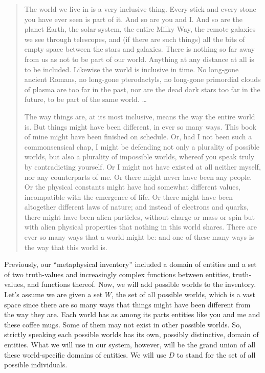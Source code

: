 \begin{quote}
  The world we live in is a very inclusive thing. Every stick and every stone
  you have ever seen is part of it. And so are you and I. And so are the planet
  Earth, the solar system, the entire Milky Way, the remote galaxies we see
  through telescopes, and (if there are such things) all the bits of empty space
  between the stars and galaxies. There is nothing so far away from us as not to
  be part of our world. Anything at any distance at all is to be included.
  Likewise the world is inclusive in time. No long-gone ancient Romans, no
  long-gone pterodactyls, no long-gone primordial clouds of plasma are too far
  in the past, nor are the dead dark stars too far in the future, to be part of
  the same world. \dots
	
  The way things are, at its most inclusive, means the way the entire world is.
  But things might have been different, in ever so many ways. This book of mine
  might have been finished on schedule. Or, had I not been such a commonsensical
  chap, I might be defending not only a plurality of possible worlds, but also a
  plurality of impossible worlds, whereof you speak truly by contradicting
  yourself. Or I might not have existed at all \dash neither myself, nor any
  counterparts of me. Or there might never have been any people. Or the physical
  constants might have had somewhat different values, incompatible with the
  emergence of life. Or there might have been altogether different laws of
  nature; and instead of electrons and quarks, there might have been alien
  particles, without charge or mass or spin but with alien physical properties
  that nothing in this world shares. There are ever so many ways that a world
  might be: and one of these many ways is the way that this world is.
\end{quote}%
%
\clearpage
{}%
Previously, our ``metaphysical inventory'' included a domain of entities and a
set of two truth-values and increasingly complex functions between entities,
truth-values, and functions thereof. Now, we will add possible worlds to the
inventory. Let's assume we are given a set $W$, the set of all possible worlds,
which is a vast space since there are so many ways that things might have been
different from the way they are. Each world has as among its parts entities like
you and me and these coffee mugs. Some of them may not exist in other possible
worlds. So, strictly speaking each possible worlds has its own, possibly
distinctive, domain of entities. What we will use in our system, however, will
be the grand union of all these world-specific domains of entities. We will use
$D$ to stand for the set of all possible individuals.


